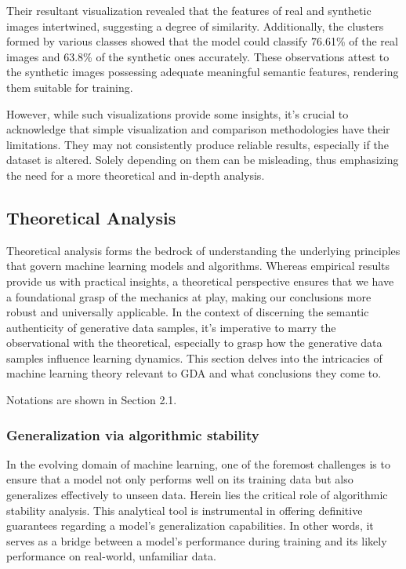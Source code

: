 \documentclass[preprint,12pt,authoryear]{elsarticle}
\begin{document}
Their resultant visualization revealed that the features of real and synthetic images intertwined, suggesting a degree of similarity. Additionally, the clusters formed by various classes showed that the model could classify 76.61\% of the real images and 63.8\% of the synthetic ones accurately. These observations attest to the synthetic images possessing adequate meaningful semantic features, rendering them suitable for training.

However, while such visualizations provide some insights, it's crucial to acknowledge that simple visualization and comparison methodologies have their limitations. They may not consistently produce reliable results, especially if the dataset is altered. Solely depending on them can be misleading, thus emphasizing the need for a more theoretical and in-depth analysis.

\subsection{Theoretical Analysis}

Theoretical analysis forms the bedrock of understanding the underlying principles that govern machine learning models and algorithms. Whereas empirical results provide us with practical insights, a theoretical perspective ensures that we have a foundational grasp of the mechanics at play, making our conclusions more robust and universally applicable. In the context of discerning the semantic authenticity of generative data samples, it's imperative to marry the observational with the theoretical, especially to grasp how the generative data samples influence learning dynamics. This section delves into the intricacies of machine learning theory relevant to GDA and what conclusions they come to.



Notations are shown in Section 2.1. 

\subsubsection{Generalization via algorithmic stability}

In the evolving domain of machine learning, one of the foremost challenges is to ensure that a model not only performs well on its training data but also generalizes effectively to unseen data. Herein lies the critical role of algorithmic stability analysis. This analytical tool is instrumental in offering definitive guarantees regarding a model's generalization capabilities. In other words, it serves as a bridge between a model's performance during training and its likely performance on real-world, unfamiliar data.
\end{document}
